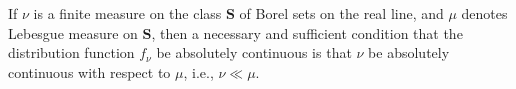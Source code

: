If $\nu$ is a finite measure on the class $\mathbf{S}$ of Borel sets on the real line, and $\mu$ denotes Lebesgue measure on $\mathbf{S}$, then a necessary and sufficient condition that the distribution function $f_\nu$ be absolutely continuous is that $\nu$ be absolutely continuous with respect to $\mu$, i.e., $\nu \ll \mu$.
